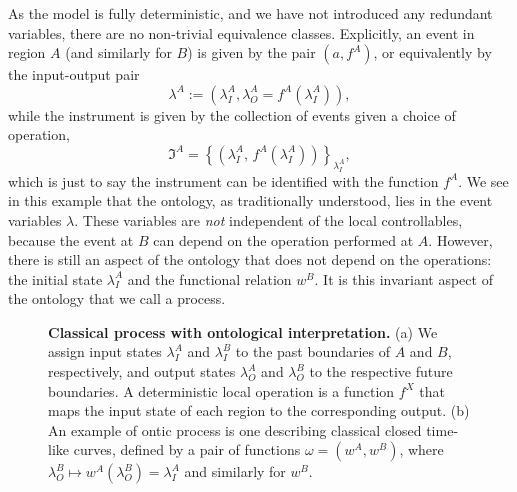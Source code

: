 \documentclass[a4paper,onecolumn,11pt,accepted=2018-05-04]{quantumarticle}
\begin{document}
As the model is fully deterministic, and we have not introduced any redundant variables, there are no non-trivial equivalence classes. Explicitly, an event in region $A$ (and similarly for $B$) is given by the pair $\left(a,f^A\right)$, or equivalently by the input-output pair 
\begin{equation}
\lambda^A := \left(\lambda^A_I,\lambda^A_O = f^A\left(\lambda^A_I\right)\right), 
\end{equation}
 while the instrument is given by the collection of events given a choice of operation, 
 \begin{equation}
 \mathfrak{I}^A = \left\{\left(\lambda_I^A,\,f^A\left(\lambda_I^A\right)\right)\right\}_{\lambda_I^A},
 \end{equation}
 which is just to say the instrument can be identified with the function $f^A$. We see in this example that the ontology, as traditionally understood, lies in the event variables $\lambda$. These variables are \emph{not} independent of the local controllables, because the event at $B$ can depend on the operation performed at $A$. However, there is still an aspect of the ontology that does not depend on the operations: the initial state $\lambda^A_I$ and the functional relation $w^B$. It is this invariant aspect of the ontology that we call a process.


\begin{figure}[ht]%
\quad
{}
\caption{\textbf{ Classical process with ontological interpretation.}{ (a) We assign input states $\lambda_I^A$ and $\lambda_I^B$ to the past boundaries of $A$ and $B$, respectively, and output states $\lambda_O^A$ and $\lambda_O^B$ to the respective future boundaries. A deterministic local operation is a function $f^X$ that maps the input state of each region to the corresponding output. (b) An example of ontic process is one describing classical closed time-like curves, defined by a pair of functions $\omega=\left(w^A, w^B\right)$, where $\lambda_O^B \mapsto w^A\left(\lambda_O^B\right) = \lambda_I^A$ and similarly for $w^B$. }}
\end{figure}
\end{document}
